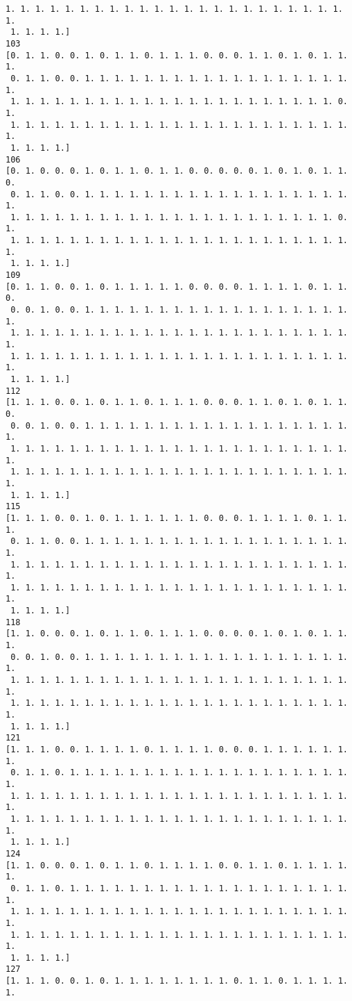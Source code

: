 \documentclass[11pt]{article}
\begin{document}
\begin{Verbatim}[commandchars=\\\{\}]
 1. 1. 1. 1. 1. 1. 1. 1. 1. 1. 1. 1. 1. 1. 1. 1. 1. 1. 1. 1. 1. 1. 1. 1.
 1. 1. 1. 1.]
103
[0. 1. 1. 0. 0. 1. 0. 1. 1. 0. 1. 1. 1. 0. 0. 0. 1. 1. 0. 1. 0. 1. 1. 1.
 0. 1. 1. 0. 0. 1. 1. 1. 1. 1. 1. 1. 1. 1. 1. 1. 1. 1. 1. 1. 1. 1. 1. 1.
 1. 1. 1. 1. 1. 1. 1. 1. 1. 1. 1. 1. 1. 1. 1. 1. 1. 1. 1. 1. 1. 1. 0. 1.
 1. 1. 1. 1. 1. 1. 1. 1. 1. 1. 1. 1. 1. 1. 1. 1. 1. 1. 1. 1. 1. 1. 1. 1.
 1. 1. 1. 1.]
106
[0. 1. 0. 0. 0. 1. 0. 1. 1. 0. 1. 1. 0. 0. 0. 0. 0. 1. 0. 1. 0. 1. 1. 0.
 0. 1. 1. 0. 0. 1. 1. 1. 1. 1. 1. 1. 1. 1. 1. 1. 1. 1. 1. 1. 1. 1. 1. 1.
 1. 1. 1. 1. 1. 1. 1. 1. 1. 1. 1. 1. 1. 1. 1. 1. 1. 1. 1. 1. 1. 1. 0. 1.
 1. 1. 1. 1. 1. 1. 1. 1. 1. 1. 1. 1. 1. 1. 1. 1. 1. 1. 1. 1. 1. 1. 1. 1.
 1. 1. 1. 1.]
109
[0. 1. 1. 0. 0. 1. 0. 1. 1. 1. 1. 1. 0. 0. 0. 0. 1. 1. 1. 1. 0. 1. 1. 0.
 0. 0. 1. 0. 0. 1. 1. 1. 1. 1. 1. 1. 1. 1. 1. 1. 1. 1. 1. 1. 1. 1. 1. 1.
 1. 1. 1. 1. 1. 1. 1. 1. 1. 1. 1. 1. 1. 1. 1. 1. 1. 1. 1. 1. 1. 1. 1. 1.
 1. 1. 1. 1. 1. 1. 1. 1. 1. 1. 1. 1. 1. 1. 1. 1. 1. 1. 1. 1. 1. 1. 1. 1.
 1. 1. 1. 1.]
112
[1. 1. 1. 0. 0. 1. 0. 1. 1. 0. 1. 1. 1. 0. 0. 0. 1. 1. 0. 1. 0. 1. 1. 0.
 0. 0. 1. 0. 0. 1. 1. 1. 1. 1. 1. 1. 1. 1. 1. 1. 1. 1. 1. 1. 1. 1. 1. 1.
 1. 1. 1. 1. 1. 1. 1. 1. 1. 1. 1. 1. 1. 1. 1. 1. 1. 1. 1. 1. 1. 1. 1. 1.
 1. 1. 1. 1. 1. 1. 1. 1. 1. 1. 1. 1. 1. 1. 1. 1. 1. 1. 1. 1. 1. 1. 1. 1.
 1. 1. 1. 1.]
115
[1. 1. 1. 0. 0. 1. 0. 1. 1. 1. 1. 1. 1. 0. 0. 0. 1. 1. 1. 1. 0. 1. 1. 1.
 0. 1. 1. 0. 0. 1. 1. 1. 1. 1. 1. 1. 1. 1. 1. 1. 1. 1. 1. 1. 1. 1. 1. 1.
 1. 1. 1. 1. 1. 1. 1. 1. 1. 1. 1. 1. 1. 1. 1. 1. 1. 1. 1. 1. 1. 1. 1. 1.
 1. 1. 1. 1. 1. 1. 1. 1. 1. 1. 1. 1. 1. 1. 1. 1. 1. 1. 1. 1. 1. 1. 1. 1.
 1. 1. 1. 1.]
118
[1. 1. 0. 0. 0. 1. 0. 1. 1. 0. 1. 1. 1. 0. 0. 0. 0. 1. 0. 1. 0. 1. 1. 1.
 0. 0. 1. 0. 0. 1. 1. 1. 1. 1. 1. 1. 1. 1. 1. 1. 1. 1. 1. 1. 1. 1. 1. 1.
 1. 1. 1. 1. 1. 1. 1. 1. 1. 1. 1. 1. 1. 1. 1. 1. 1. 1. 1. 1. 1. 1. 1. 1.
 1. 1. 1. 1. 1. 1. 1. 1. 1. 1. 1. 1. 1. 1. 1. 1. 1. 1. 1. 1. 1. 1. 1. 1.
 1. 1. 1. 1.]
121
[1. 1. 1. 0. 0. 1. 1. 1. 1. 0. 1. 1. 1. 1. 0. 0. 0. 1. 1. 1. 1. 1. 1. 1.
 0. 1. 1. 0. 1. 1. 1. 1. 1. 1. 1. 1. 1. 1. 1. 1. 1. 1. 1. 1. 1. 1. 1. 1.
 1. 1. 1. 1. 1. 1. 1. 1. 1. 1. 1. 1. 1. 1. 1. 1. 1. 1. 1. 1. 1. 1. 1. 1.
 1. 1. 1. 1. 1. 1. 1. 1. 1. 1. 1. 1. 1. 1. 1. 1. 1. 1. 1. 1. 1. 1. 1. 1.
 1. 1. 1. 1.]
124
[1. 1. 0. 0. 0. 1. 0. 1. 1. 0. 1. 1. 1. 1. 0. 0. 1. 1. 0. 1. 1. 1. 1. 1.
 0. 1. 1. 0. 1. 1. 1. 1. 1. 1. 1. 1. 1. 1. 1. 1. 1. 1. 1. 1. 1. 1. 1. 1.
 1. 1. 1. 1. 1. 1. 1. 1. 1. 1. 1. 1. 1. 1. 1. 1. 1. 1. 1. 1. 1. 1. 1. 1.
 1. 1. 1. 1. 1. 1. 1. 1. 1. 1. 1. 1. 1. 1. 1. 1. 1. 1. 1. 1. 1. 1. 1. 1.
 1. 1. 1. 1.]
127
[1. 1. 1. 0. 0. 1. 0. 1. 1. 1. 1. 1. 1. 1. 1. 0. 1. 1. 0. 1. 1. 1. 1. 1.

\end{Verbatim}
\end{document}
